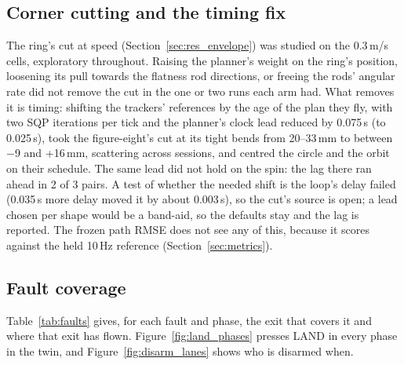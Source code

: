 \subsection{Corner cutting and the timing fix}
\label{sec:app_corner}

The ring's cut at speed (Section~\ref{sec:res_envelope}) was studied on the 0.3\,m/s cells, exploratory throughout.
Raising the planner's weight on the ring's position, loosening its pull towards the flatness rod directions, or
freeing the rods' angular rate did not remove the cut in the one or two runs each arm had. What removes it is timing: shifting the trackers' references by the age of the plan they fly, with two SQP
iterations per tick and the planner's clock lead reduced by 0.075\,s (to 0.025\,s), took the figure-eight's cut at its tight bends
from 20--33\,mm to between $-$9 and +16\,mm, scattering across sessions, and centred the circle and the orbit on their
schedule. The same lead did
not hold on the spin: the lag there ran ahead in 2 of 3 pairs. A test of whether the needed shift is the loop's delay failed (0.035\,s more delay moved
it by about 0.003\,s), so the cut's source is open; a lead chosen per shape would be a band-aid, so the defaults stay
and the lag is reported. The frozen path RMSE does not see any of this, because it scores against the held
10\,Hz reference (Section~\ref{sec:metrics}).

\subsection{Fault coverage}
\label{sec:app_faults}

Table~\ref{tab:faults} gives, for each fault and phase, the exit that covers it and where that exit has flown.
Figure~\ref{fig:land_phases} presses LAND in every phase in the twin, and Figure~\ref{fig:disarm_lanes} shows who is
disarmed when.


